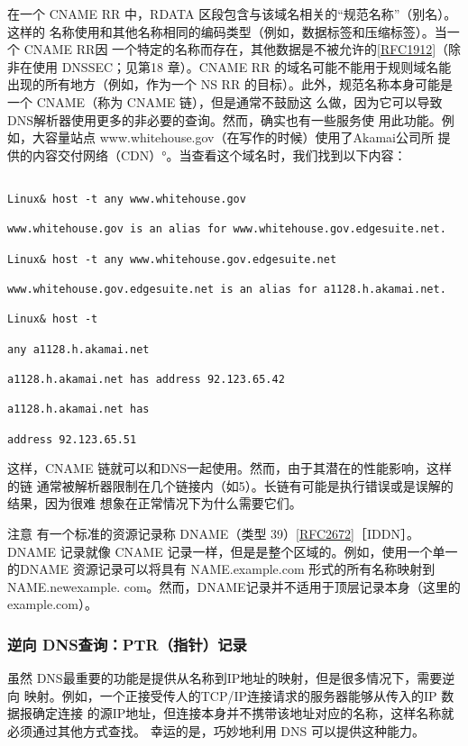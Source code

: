在一个 CNAME RR 中，RDATA 区段包含与该域名相关的“规范名称”（别名）。这样的
名称使用和其他名称相同的编码类型（例如，数据标签和压缩标签）。当一个 CNAME RR因
一个特定的名称而存在，其他数据是不被允许的\href{https://www.rfc-editor.org/rfc/rfc1912}{[RFC1912]}（除非在使用 DNSSEC；见第18
章）。CNAME RR 的域名可能不能用于规则域名能出现的所有地方（例如，作为一个 NS RR
的目标）。此外，规范名称本身可能是一个 CNAME（称为 CNAME 链），但是通常不鼓励这
么做，因为它可以导致DNS解析器使用更多的非必要的查询。然而，确实也有一些服务使
用此功能。例如，大容量站点 www.whitehouse.gov（在写作的时候）使用了Akamai公司所
提供的内容交付网络（CDN）°。当查看这个域名时，我们找到以下内容：

\begin{verbatim}
    
Linux& host -t any www.whitehouse.gov

www.whitehouse.gov is an alias for www.whitehouse.gov.edgesuite.net.

Linux& host -t any www.whitehouse.gov.edgesuite.net

www.whitehouse.gov.edgesuite.net is an alias for a1128.h.akamai.net.

Linux& host -t

any a1128.h.akamai.net

a1128.h.akamai.net has address 92.123.65.42

a1128.h.akamai.net has

address 92.123.65.51
\end{verbatim}

这样，CNAME 链就可以和DNS一起使用。然而，由于其潜在的性能影响，这样的链
通常被解析器限制在几个链接内（如5）。长链有可能是执行错误或是误解的结果，因为很难
想象在正常情况下为什么需要它们。

注意 有一个标准的资源记录称 DNAME（类型 39）\href{https://www.rfc-editor.org/rfc/rfc2672}{[RFC2672]}［IDDN］。 DNAME
记录就像 CNAME 记录一样，但是是整个区域的。例如，使用一个单一的DNAME
资源记录可以将具有 NAME.example.com 形式的所有名称映射到 NAME.newexample.
com。然而，DNAME记录并不适用于顶层记录本身（这里的 example.com）。

\subsubsection{逆向 DNS查询：PTR（指针）记录}

虽然 DNS最重要的功能是提供从名称到IP地址的映射，但是很多情况下，需要逆向
映射。例如，一个正接受传人的TCP/IP连接请求的服务器能够从传入的IP 数据报确定连接
的源IP地址，但连接本身并不携带该地址对应的名称，这样名称就必须通过其他方式查找。
幸运的是，巧妙地利用 DNS 可以提供这种能力。

